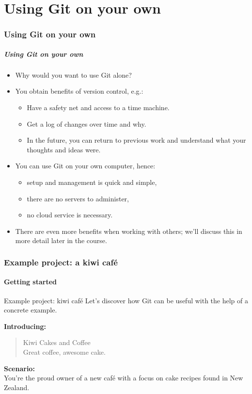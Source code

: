 \part{Using Git on your own}

\section{Using Git on your own}

\begin{frame}
\frametitle{Using Git on your own}
\begin{itemize}
    \item Why would you want to use Git alone?
    \item You obtain benefits of version control, e.g.:
        \begin{itemize}
            \item Have a safety net and access to a time machine.
            \item Get a log of changes over time and why.
            \item In the future, you can return to previous work and
                understand what your thoughts and ideas were.
        \end{itemize}
    \item You can use Git on your own computer, hence:
        \begin{itemize}
            \item setup and management is quick and simple,
            \item there are no servers to administer,
            \item no cloud service is necessary.
        \end{itemize}
    \item There are even more benefits when working with others; we'll
        discuss this in more detail later in the course.
\end{itemize}
\end{frame}

\section{Example project: a kiwi café}

\subsection{Getting started}

\begin{frame}{Example project: kiwi café}
Let's discover how Git can be useful with the help of a concrete example.

    \textbf{Introducing:}
    \begin{quote}
        Kiwi Cakes and Coffee\\
        Great coffee, awesome cake.
    \end{quote}

    \textbf{Scenario:}\\
    You're the proud owner of a new café with a focus on cake recipes found
    in New Zealand.
\end{frame}

